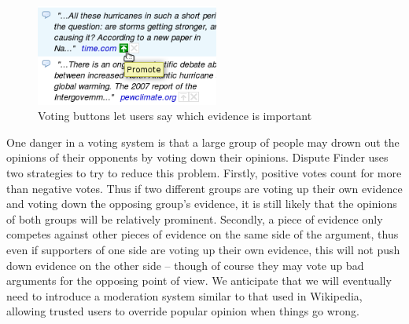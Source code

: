 \documentclass{www2010-submission}
\newcommand{\todo}[1]{}
\begin{document}
\begin{figure}[tb]
	\begin{center}
	\includegraphics[width=6cm]{../screenshots/v2_vote.png}
	\caption{Voting buttons let users say which evidence is important}
	\label{voting}
	\end{center}
\end{figure}


One danger in a voting system is that a large group of people may drown out the opinions of their opponents by voting down their opinions. Dispute Finder uses two strategies to try to reduce this problem. Firstly, positive votes count for more than negative votes. Thus if two different groups are voting up their own evidence and voting down the opposing group's evidence, it is still likely that the opinions of both groups will be relatively prominent. Secondly, a piece of evidence only competes against other pieces of evidence on the same side of the argument, thus even if supporters of one side are voting up their own evidence, this will not push down evidence on the other side -- though of course they may vote up bad arguments for the opposing point of view. We anticipate that we will eventually need to introduce a moderation system similar to that used in Wikipedia, allowing trusted users to override popular opinion when things go wrong. 
\todo{Talk about whether we know if this works}

\todo{Talk about searches}
\todo{Cite work on collaborative filtering}
\todo{Mention the sidebar?}

\end{document}
